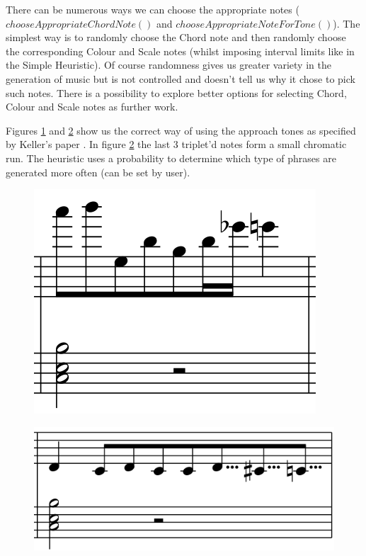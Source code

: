 \documentclass[pdftex,12pt,a4paper]{report}
\begin{document}
There can be numerous ways we can choose the appropriate notes ($chooseAppropriateChordNote()$ and $chooseAppropriateNoteForTone()$). The simplest way is to randomly choose the Chord note and then randomly choose the corresponding Colour and Scale notes (whilst imposing interval limits like in the Simple Heuristic). Of course randomness gives us greater variety in the generation of music but is not controlled and doesn't tell us why it chose to pick such notes. There is a possibility to explore better options for selecting Chord, Colour and Scale notes as further work. 

Figures \ref{fig:lookaheadapproach1} and \ref{fig:lookaheadapproach2} show us the correct way of using the approach tones as specified by Keller's paper \cite{keller07}. In figure \ref{fig:lookaheadapproach2} the last 3 triplet'd notes form a small chromatic run. The heuristic uses a probability to determine which type of phrases are generated more often (can be set by user).



\begin{figure}[h]
  \centering
  \includegraphics[scale=0.33]{figure/lookaheadapproach1.png}
  \label{fig:lookaheadapproach1}
\end{figure}

\begin{figure}[h]
  \centering
  \includegraphics[scale=0.35]{figure/lookaheadapproach2.png}
  \label{fig:lookaheadapproach2}
\end{figure}
\end{document}
